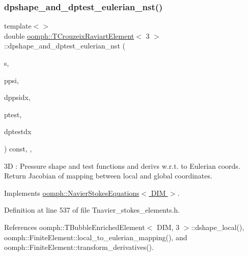 \subsubsection{\texorpdfstring{dpshape\+\_\+and\+\_\+dptest\+\_\+eulerian\+\_\+nst()}{dpshape\_and\_dptest\_eulerian\_nst()}\hspace{0.1cm}{\footnotesize\ttfamily [3/3]}}
{\footnotesize\ttfamily template$<$$>$ \\
double \hyperlink{classoomph_1_1TCrouzeixRaviartElement}{oomph\+::\+T\+Crouzeix\+Raviart\+Element}$<$ 3 $>$\+::dpshape\+\_\+and\+\_\+dptest\+\_\+eulerian\+\_\+nst (\begin{DoxyParamCaption}\item[{const \hyperlink{classoomph_1_1Vector}{Vector}$<$ double $>$ \&}]{s,  }\item[{\hyperlink{classoomph_1_1Shape}{Shape} \&}]{ppsi,  }\item[{\hyperlink{classoomph_1_1DShape}{D\+Shape} \&}]{dppsidx,  }\item[{\hyperlink{classoomph_1_1Shape}{Shape} \&}]{ptest,  }\item[{\hyperlink{classoomph_1_1DShape}{D\+Shape} \&}]{dptestdx }\end{DoxyParamCaption}) const\hspace{0.3cm}{\ttfamily [inline]}, {\ttfamily [protected]}, {\ttfamily [virtual]}}

3D \+: Pressure shape and test functions and derivs w.\+r.\+t. to Eulerian coords. Return Jacobian of mapping between local and global coordinates. 

Implements \hyperlink{classoomph_1_1NavierStokesEquations_a2f3024a4d370ec45ddffacb236bc2bb2}{oomph\+::\+Navier\+Stokes\+Equations$<$ D\+I\+M $>$}.



Definition at line 537 of file Tnavier\+\_\+stokes\+\_\+elements.\+h.



References oomph\+::\+T\+Bubble\+Enriched\+Element$<$ D\+I\+M, 3 $>$\+::dshape\+\_\+local(), oomph\+::\+Finite\+Element\+::local\+\_\+to\+\_\+eulerian\+\_\+mapping(), and oomph\+::\+Finite\+Element\+::transform\+\_\+derivatives().

\mbox{\label{classoomph_1_1TCrouzeixRaviartElement_a9bedb2d2acd571834e7023831981e576}} 
